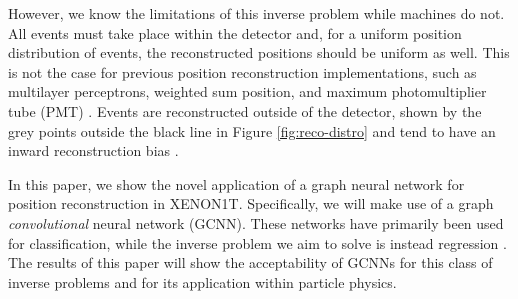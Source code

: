 \documentclass[../thesis.tex]{subfiles}
\begin{document}
\par However, we know the limitations of this inverse problem while machines do not.
All events must take place within the detector and, for a uniform position distribution of events, the reconstructed positions should be uniform as well.
This is not the case for previous position reconstruction implementations, such as multilayer perceptrons, weighted sum position, and maximum photomultiplier tube (PMT) \cite{Bart}.
Events are reconstructed outside of the detector, shown by the grey points outside the black line in Figure \ref{fig:reco-distro} and tend to have an inward reconstruction bias \cite{Bart}.

\par In this paper, we show the novel application of a graph neural network for position reconstruction in XENON1T.
Specifically, we will make use of a graph \textit{convolutional} neural network (GCNN).
These networks have primarily been used for classification, while the inverse problem we aim to solve is instead regression \cite{GCNN_Kipf}.
The results of this paper will show the acceptability of GCNNs for this class of inverse problems and for its application within particle physics.
\end{document}

